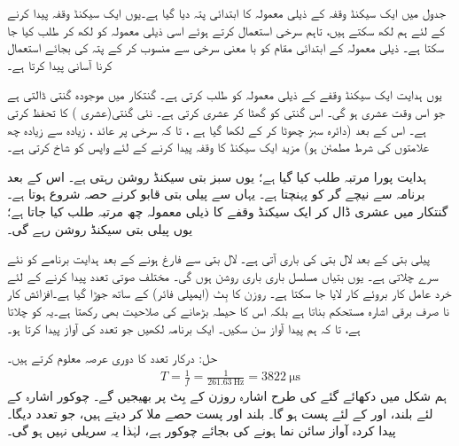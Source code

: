 جدول  میں ایک سیکنڈ وقفہ کے ذیلی معمولہ کا ابتدائی پتہ  دیا گیا ہے۔یوں ایک سیکنڈ وقفہ پیدا کرنے کے لئے ہم  لکھ سکتے ہیں، تاہم سرخی استعمال کرتے ہوئے اسی ذیلی معمولہ کو  لکھ کر  طلب کیا جا سکتا ہے۔ ذیلی معمولہ کے ابتدائی مقام کو با  معنی   سرخی  سے منسوب کر کے پتہ کی بجائے استعمال کرنا  آسانی پیدا کرتا ہے۔

یوں  ہدایت  ایک سیکنڈ وقفے کے ذیلی معمولہ کو طلب  کرتی ہے۔ گنتکار میں موجودہ گنتی ڈالتی ہے جو اس وقت  عشری  ہو گی۔ \DCR{\regA} اس گنتی کو گھٹا کر عشری  کرتی ہے۔   نئی گنتی(عشری   ) کا تحفظ کرتی ہے۔ اس کے بعد  (دائرہ سبز چھوٹا کر کے لکھا گیا ہے ، تا کہ سرخی پر عائد ، زیادہ سے زیادہ  چھ علامتوں کی شرط مطمئن  ہو)  مزید ایک سیکنڈ کا  وقفہ پیدا کرنے کے لئے واپس  کو شاخ کرتی ہے۔

ہدایت  پورا  مرتبہ طلب کیا گیا ہے؛ یوں سبز بتی  سیکنڈ روشن  رہتی ہے۔ اس کے بعد برنامہ  سے نیچے گر کو   پہنچتا ہے۔ یہاں سے پیلی بتی قابو کرنے حصہ  شروع ہوتا ہے۔ گنتکار  میں عشری  ڈال کر ایک سیکنڈ وقفے کا ذیلی معمولہ  چھ مرتبہ طلب کیا جاتا ہے؛ یوں پیلی بتی  سیکنڈ روشن رہے گی۔

پیلی بتی کے بعد لال بتی کی باری آتی ہے۔ لال بتی  سے فارغ ہونے کے بعد  ہدایت  برنامے کو نئے سرے  چلاتی ہے۔ یوں بتیاں مسلسل باری باری روشن ہوں گی۔
 مختلف صوتی تعدد   پیدا کرنے کے لئے  خرد عامل کار بروئے کار لایا  جا سکتا ہے۔ روزن  کا بِٹ  (ایمپلی فائر)  کے ساتھ  جوڑا گیا ہے۔افزائش کار نا صرف برقی اشارہ مستحکم بناتا ہے بلکہ اس کا حیطہ بڑھانے کی صلاحیت بھی رکھتا ہے۔یہ     کو چلاتا ہے، تا کہ ہم  پیدا آواز  سن سکیں۔ ایک برنامہ لکھیں جو  تعدد کی آواز پیدا کرتا ہو۔

حل:\quad
درکار تعدد کا دوری عرصہ معلوم کرتے ہیں۔
\begin{align*}
T=\frac{1}{f}=\frac{1}{\SI{261.63}{\hertz}}=\SI{3822}{\micro\second}
\end{align*}
ہم شکل   میں دکھائے گئے کی  طرح  اشارہ  روزن  کے بِٹ  پر بھیجیں گے۔  چوکور اشارہ  کے لئے بلند، اور  کے لئے پست ہو گا۔ بلند اور پست حصے ملا کر  دیتے ہیں، جو  تعدد دیگا۔  پیدا کردہ  آواز سائن نما ہونے کی بجائے چوکور ہے، لہٰذا  یہ  سریلی  نہیں ہو گی۔

